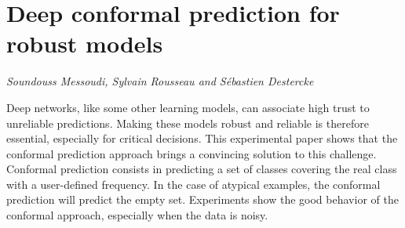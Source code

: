 \documentclass[../booklet.tex]{subfiles}
\begin{document}
\section[Deep conformal prediction for robust models. {\it Soundouss Messoudi, Sylvain Rousseau and Sébastien Destercke}]{Deep conformal prediction for robust models}
  

\begin{center}
  {\it Soundouss Messoudi, Sylvain Rousseau and Sébastien Destercke}
\end{center}

\vskip 0.8cm


Deep networks, like some other learning models, can associate high trust to unreliable predictions. Making these models robust and reliable is therefore essential, especially for critical decisions. This experimental paper shows that the conformal prediction approach brings a convincing solution to this challenge. Conformal prediction consists in predicting a set of classes covering the real class with a user-defined frequency. In the case of atypical examples, the conformal prediction will predict the empty set. Experiments show the good behavior of the conformal approach, especially when the data is noisy.

\end{document}
